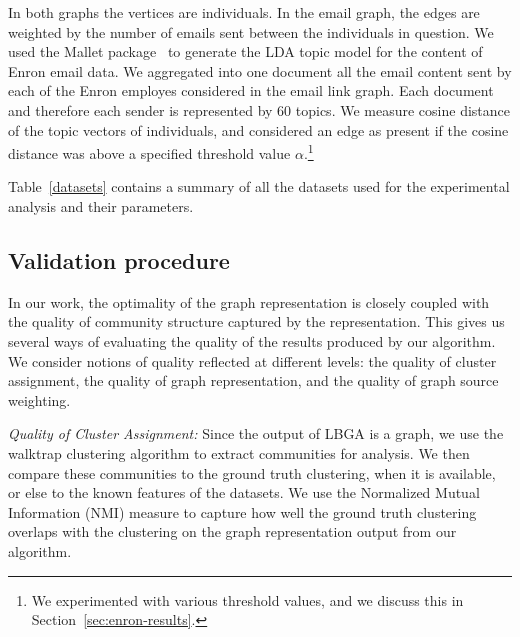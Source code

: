 \documentclass{IEEEtran}
\begin{document}
In both graphs the vertices are individuals. In the email graph, the edges are
weighted by the number of emails sent between the individuals in question. We
used the Mallet package~\cite{mallet} to generate the LDA topic model for the
content of Enron email data. We aggregated into one document all the email
content sent by each of the Enron employes considered in the email link graph.
Each document and therefore each sender is represented by 60 topics. We measure
cosine distance of the topic vectors of individuals, and considered an edge as
present if the cosine distance was above a specified threshold value
$\alpha$.\footnote{We experimented with various threshold values, and we
discuss this in Section~\ref{sec:enron-results}.}

Table~\ref{datasets} contains a summary of all the datasets used for
the experimental analysis and their parameters. 


\subsection{Validation procedure} 
\label{sec:validation}
In our work, the optimality of the graph representation is closely coupled with
the quality of community structure captured by the representation. This gives
us several ways of evaluating the quality of the results produced by our
algorithm. We consider notions of quality reflected at different levels: the
quality of cluster assignment, the quality of graph representation, and the
quality of graph source weighting. 

{\em Quality of Cluster Assignment:} Since the output of LBGA is a graph, we
use the walktrap clustering algorithm to extract communities for analysis. We
then compare these communities to the ground truth clustering, when it is
available, or else to the known features of the datasets.  We use the
Normalized Mutual Information (NMI) measure \cite{Danon05} to capture how well
the ground truth clustering overlaps with the clustering on the graph
representation output from our algorithm. 
\end{document}
